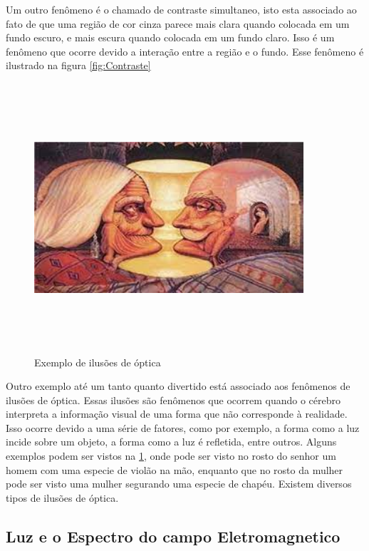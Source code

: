 \documentclass[12pt]{article}
\begin{document}
    Um outro fenômeno é o chamado de contraste simultaneo, isto esta associado ao fato de que uma região de cor cinza parece mais clara
    quando colocada em um fundo escuro, e mais escura quando colocada em um fundo claro. Isso é um fenômeno que ocorre devido a interação
    entre a região e o fundo. Esse fenômeno é ilustrado na figura \ref{fig:Contraste}

    \begin{figure}[H]
        \centering
        \includegraphics[width=10cm,height=10cm]{images/13.png}
        \caption{Exemplo de ilusões de óptica}
        \label{fig:ilusao}
    \end{figure}
    Outro exemplo até um tanto quanto divertido está associado aos fenômenos de ilusões de óptica.
    Essas ilusões são fenômenos que ocorrem quando o cérebro interpreta a informação visual de uma forma
    que não corresponde à realidade. Isso ocorre devido a uma série de fatores, como por exemplo, a
    forma como a luz incide sobre um objeto, a forma como a luz é refletida, entre outros.
    Alguns exemplos podem ser vistos na \ref{fig:ilusao}, onde pode ser visto no rosto do senhor
    um homem com uma especie de violão na mão, enquanto que no rosto da mulher pode ser visto uma mulher
    segurando uma especie de chapéu. Existem diversos tipos de ilusões de óptica.

    \subsection{Luz e o Espectro do campo Eletromagnetico}
\end{document}
